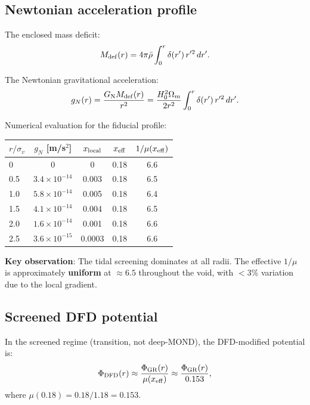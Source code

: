 \documentclass[11pt,a4paper]{article}
\newcommand{\ee}[1]{\times 10^{#1}}
\newcommand{\mufd}{\mu}
\newcommand{\GN}{G_{\rm N}}
\newcommand{\Omm}{\Omega_m}
\begin{document}
\subsection{Newtonian acceleration profile}

The enclosed mass deficit:
\begin{equation}
M_{\rm def}(r) = 4\pi\bar{\rho}\int_0^r \delta(r')\,r'^2\,dr'.
\end{equation}

The Newtonian gravitational acceleration:
\begin{equation}
g_N(r) = \frac{\GN M_{\rm def}(r)}{r^2}
= \frac{H_0^2\Omm}{2r^2}\int_0^r \delta(r')\,r'^2\,dr'.
\label{eq:gN-profile}
\end{equation}

Numerical evaluation for the fiducial profile:
\begin{center}
\begin{tabular}{lcccc}
\toprule
$r/\sigma_v$ & $g_N$ [m/s$^2$] & $x_{\rm local}$ & $x_{\rm eff}$
& $1/\mufd(x_{\rm eff})$ \\
\midrule
0 & 0 & 0 & 0.18 & 6.6 \\
0.5 & $3.4\ee{-14}$ & 0.003 & 0.18 & 6.5 \\
1.0 & $5.8\ee{-14}$ & 0.005 & 0.18 & 6.4 \\
1.5 & $4.1\ee{-14}$ & 0.004 & 0.18 & 6.5 \\
2.0 & $1.6\ee{-14}$ & 0.001 & 0.18 & 6.6 \\
2.5 & $3.6\ee{-15}$ & 0.0003 & 0.18 & 6.6 \\
\bottomrule
\end{tabular}
\end{center}

\textbf{Key observation}: The tidal screening dominates at all radii.
The effective $1/\mufd$ is approximately \textbf{uniform} at $\approx 6.5$
throughout the void, with $< 3\%$ variation due to the local gradient.


\subsection{Screened DFD potential}

In the screened regime (transition, not deep-MOND), the DFD-modified
potential is:
\begin{equation}
\Phi_{\rm DFD}(r) \approx \frac{\Phi_{\rm GR}(r)}
{\mufd(x_{\rm eff})}
\approx \frac{\Phi_{\rm GR}(r)}{0.153},
\label{eq:Phi-DFD-screened}
\end{equation}
where $\mufd(0.18) = 0.18/1.18 = 0.153$.
\end{document}
